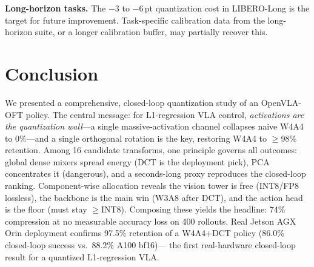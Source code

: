 \documentclass[conference]{IEEEtran}
\begin{document}
\textbf{Long-horizon tasks.} The $-$3 to $-$6\,pt quantization cost in LIBERO-Long is the
target for future improvement. Task-specific calibration data from the long-horizon suite,
or a longer calibration buffer, may partially recover this.

\section{Conclusion}
\label{sec:conclusion}

We presented a comprehensive, closed-loop quantization study of an OpenVLA-OFT policy. The
central message: for L1-regression VLA control, \emph{activations are the quantization
wall}---a single massive-activation channel collapses naive W4A4 to 0\%---and a single
orthogonal rotation is the key, restoring W4A4 to $\geq$98\% retention. Among 16 candidate
transforms, one principle governs all outcomes: global dense mixers spread energy (DCT is
the deployment pick), PCA concentrates it (dangerous), and a seconds-long proxy reproduces
the closed-loop ranking. Component-wise allocation reveals the vision tower is free (INT8/FP8
lossless), the backbone is the main win (W3A8 after DCT), and the action head is the floor
(must stay $\geq$INT8). Composing these yields the headline: 74\% compression at no
measurable accuracy loss on 400 rollouts. Real Jetson AGX Orin deployment confirms
97.5\% retention of a W4A4+DCT policy (86.0\% closed-loop success vs.\ 88.2\% A100 bf16)---
the first real-hardware closed-loop result for a quantized L1-regression VLA.

\end{document}
